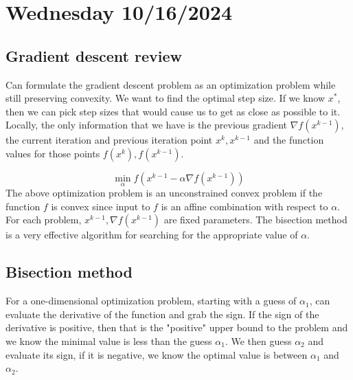 \section{Wednesday 10/16/2024}
\subsection{Gradient descent review}
Can formulate the gradient descent problem as an optimization problem while still preserving convexity. We want to find the optimal step size. If we know $x^*$, then we can pick step sizes that would cause us to get as close as possible to it. Locally, the only information that we have is the previous gradient $\nabla f(x^{k-1})$, the current iteration and previous iteration point $x^k, x^{k-1}$ and the function values for those points $f(x^k),f(x^{k-1})$.

\begin{equation}
  \min_\alpha f(x^{k-1} - \alpha \nabla f(x^{k-1}))
\end{equation}
The above optimization problem is an unconstrained convex problem if the function $f$ is convex since input to $f$ is an affine combination with respect to $\alpha$. For each problem, $x^{k-1}, \nabla f(x^{k-1})$ are fixed parameters. The bisection method is a very effective algorithm for searching for the appropriate value of $\alpha$.

\subsection{Bisection method}
For a one-dimensional optimization problem, starting with a guess of $\alpha_1$, can evaluate the derivative of the function and grab the sign. If the sign of the derivative is positive, then that is the "positive" upper bound to the problem and we know the minimal value is less than the guess $\alpha_1$. We then guess $\alpha_2$ and evaluate its sign, if it is negative, we know the optimal value is between $\alpha_1$ and $\alpha_2$.